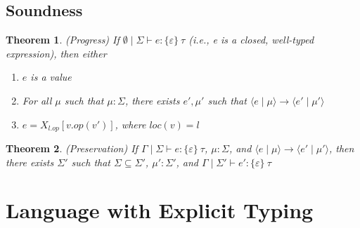 \documentclass{article}
\newtheorem{theorem}{Theorem}[section]
\begin{document}
\subsection{Soundness}
\begin{theorem} (Progress) If $\emptyset \mid \Sigma \vdash e : \{\varepsilon\}\ \tau$ (i.e., e is a closed, well-typed expression), then either 
\begin{enumerate}
\item $e$ is a value
\item For all $ \mu$ such that $\mu : \Sigma$, there exists $e', \mu'$ such that $\langle e \mid \mu \rangle \longrightarrow \langle e' \mid \mu' \rangle $
\item $e = X_{l.op}[v.op(v')]$, where $loc(v) = l$
\end{enumerate}
\end{theorem}

\begin{theorem} (Preservation) If $\Gamma \mid \Sigma \vdash e : \{\varepsilon\}\ \tau$, $\mu : \Sigma$, and ${ \langle e \mid \mu \rangle \longrightarrow \langle e' \mid \mu' \rangle }$, then there exists $\Sigma'$ such that $\Sigma \subseteq \Sigma'$, $\mu' : \Sigma'$, and $\Gamma \mid \Sigma' \vdash e' : \{\varepsilon\}\ \tau$
\end{theorem}

\pagebreak
\section{Language with Explicit Typing}
\end{document}
